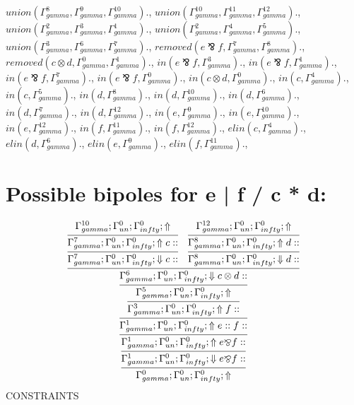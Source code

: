 \documentclass[a4paper, 11pt]{article}
\begin{document}
$union(\Gamma_{gamma}^{8}, \Gamma_{gamma}^{9}, \Gamma_{gamma}^{10}).$, $union(\Gamma_{gamma}^{10}, \Gamma_{gamma}^{11}, \Gamma_{gamma}^{12}).$, $union(\Gamma_{gamma}^{2}, \Gamma_{gamma}^{3}, \Gamma_{gamma}^{1}).$, $union(\Gamma_{gamma}^{2}, \Gamma_{gamma}^{4}, \Gamma_{gamma}^{5}).$, $union(\Gamma_{gamma}^{3}, \Gamma_{gamma}^{6}, \Gamma_{gamma}^{7}).$, $removed(e \bindnasrepma f, \Gamma_{gamma}^{7}, \Gamma_{gamma}^{8}).$, $removed(c \otimes d, \Gamma_{gamma}^{0}, \Gamma_{gamma}^{1}).$, $in(e \bindnasrepma f, \Gamma_{gamma}^{3}).$, $in(e \bindnasrepma f, \Gamma_{gamma}^{1}).$, $in(e \bindnasrepma f, \Gamma_{gamma}^{7}).$, $in(e \bindnasrepma f, \Gamma_{gamma}^{0}).$, $in(c \otimes d, \Gamma_{gamma}^{0}).$, $in(c, \Gamma_{gamma}^{4}).$, $in(c, \Gamma_{gamma}^{5}).$, $in(d, \Gamma_{gamma}^{8}).$, $in(d, \Gamma_{gamma}^{10}).$, $in(d, \Gamma_{gamma}^{6}).$, $in(d, \Gamma_{gamma}^{7}).$, $in(d, \Gamma_{gamma}^{12}).$, $in(e, \Gamma_{gamma}^{9}).$, $in(e, \Gamma_{gamma}^{10}).$, $in(e, \Gamma_{gamma}^{12}).$, $in(f, \Gamma_{gamma}^{11}).$, $in(f, \Gamma_{gamma}^{12}).$, $elin(c, \Gamma_{gamma}^{4}).$, $elin(d, \Gamma_{gamma}^{6}).$, $elin(e, \Gamma_{gamma}^{9}).$, $elin(f, \Gamma_{gamma}^{11}).$, 
\section{Possible bipoles for e | f / c * d:} 

\[
\infer{\Gamma_{ gamma}^{0} ; \Gamma_{un}^{0} ; \Gamma_{ infty}^{0} ;  \Uparrow }
{\infer{\Gamma_{ gamma}^{1} ; \Gamma_{un}^{0} ; \Gamma_{ infty}^{0} ;  \Downarrow e \bindnasrepma f :: }
{\infer{\Gamma_{ gamma}^{1} ; \Gamma_{un}^{0} ; \Gamma_{ infty}^{0} ;  \Uparrow e \bindnasrepma f :: }
{\infer{\Gamma_{ gamma}^{1} ; \Gamma_{un}^{0} ; \Gamma_{ infty}^{0} ;  \Uparrow e :: f :: }
{\infer{\Gamma_{ gamma}^{3} ; \Gamma_{un}^{0} ; \Gamma_{ infty}^{0} ;  \Uparrow f :: }
{\infer{\Gamma_{ gamma}^{5} ; \Gamma_{un}^{0} ; \Gamma_{ infty}^{0} ;  \Uparrow }
{\infer{\Gamma_{ gamma}^{6} ; \Gamma_{un}^{0} ; \Gamma_{ infty}^{0} ;  \Downarrow c \otimes d :: }
{\infer{\Gamma_{ gamma}^{7} ; \Gamma_{un}^{0} ; \Gamma_{ infty}^{0} ;  \Downarrow c :: }
{\infer{\Gamma_{ gamma}^{7} ; \Gamma_{un}^{0} ; \Gamma_{ infty}^{0} ;  \Uparrow c :: }
{\Gamma_{ gamma}^{10} ; \Gamma_{un}^{0} ; \Gamma_{ infty}^{0} ;  \Uparrow }}
&
\infer{\Gamma_{ gamma}^{8} ; \Gamma_{un}^{0} ; \Gamma_{ infty}^{0} ;  \Downarrow d :: }
{\infer{\Gamma_{ gamma}^{8} ; \Gamma_{un}^{0} ; \Gamma_{ infty}^{0} ;  \Uparrow d :: }
{\Gamma_{ gamma}^{12} ; \Gamma_{un}^{0} ; \Gamma_{ infty}^{0} ;  \Uparrow }}}}}}}}}
\]
CONSTRAINTS
\end{document}
